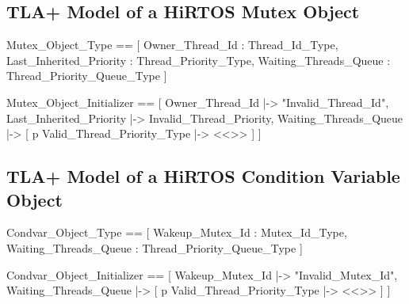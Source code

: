 \documentclass[sigplan,anonymous,10pt]{acmart}
\begin{document}
\subsection{TLA+ Model of a HiRTOS Mutex Object}
\begin{tla}
Mutex_Object_Type == [
    Owner_Thread_Id : Thread_Id_Type,
    Last_Inherited_Priority : Thread_Priority_Type,
    Waiting_Threads_Queue : 
      Thread_Priority_Queue_Type
]

Mutex_Object_Initializer == [
    Owner_Thread_Id |-> "Invalid_Thread_Id",
    Last_Inherited_Priority |-> Invalid_Thread_Priority,
    Waiting_Threads_Queue |->
        [ p \in Valid_Thread_Priority_Type |-> <<>> ]
]
\end{tla}
\begin{tlatex}
\@x{ Mutex\_Object\_Type \.{\defeq} [}%
%
%
%
%
\@x{ ]}%
\@pvspace{8.0pt}%
\@x{ Mutex\_Object\_Initializer \.{\defeq} [}%
%
%
\@x{ ]}%
\end{tlatex}

\subsection{TLA+ Model of a HiRTOS Condition Variable Object}
\begin{tla}
Condvar_Object_Type == [
    Wakeup_Mutex_Id : Mutex_Id_Type,
    Waiting_Threads_Queue : 
      Thread_Priority_Queue_Type
]

Condvar_Object_Initializer == [
    Wakeup_Mutex_Id |-> "Invalid_Mutex_Id",
    Waiting_Threads_Queue |->
        [ p \in Valid_Thread_Priority_Type |-> <<>> ]
]
\end{tla}
\begin{tlatex}
\@x{ Condvar\_Object\_Type \.{\defeq} [}%
%
%
%
\@x{ ]}%
\@pvspace{8.0pt}%
\@x{ Condvar\_Object\_Initializer \.{\defeq} [}%
%
%
\@x{ ]}%
\end{tlatex}
\end{document}
